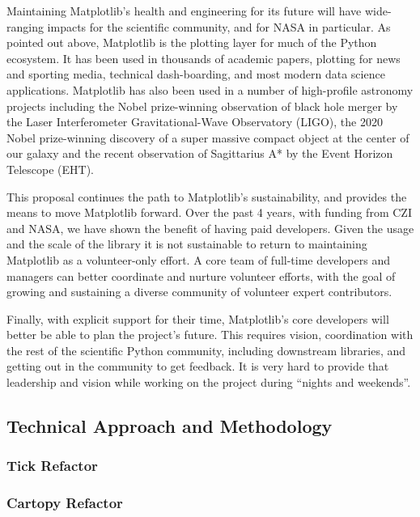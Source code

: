 \documentclass[12pt]{article}
\numberwithin{page}{section}
\begin{document}
Maintaining Matplotlib's health and engineering for its future will
have wide-ranging impacts for the scientific community, and for NASA in
particular.  As pointed out above, Matplotlib is the plotting layer
for much of the Python ecosystem.  It has been used in thousands of
academic papers, plotting for news and sporting media, technical
dash-boarding, and most modern data science applications.
Matplotlib has also been used in a number
of high-profile astronomy projects including the Nobel prize-winning
observation of black hole merger by the Laser Interferometer
Gravitational-Wave Observatory (LIGO), the 2020 Nobel prize-winning
discovery of a super massive compact object at the center of our
galaxy and the recent observation of Sagittarius A* by the Event
Horizon Telescope (EHT).

This proposal continues the path to Matplotlib's sustainability, and provides the means to
move Matplotlib forward.  Over the past 4 years, with funding from CZI and NASA, we have
shown the benefit of having paid developers.  Given the usage and the scale of
the library it is not sustainable to return to maintaining Matplotlib as a
volunteer-only effort.  A core team of full-time developers and managers can
better coordinate and nurture volunteer efforts, with the goal of growing and
sustaining a diverse community of volunteer expert contributors.

Finally, with explicit support for their time, Matplotlib's core developers
will better be able to plan the project's future.  This requires vision,
coordination with the rest of the scientific Python community, including
downstream libraries, and getting out in the community to get feedback.  It is
very hard to provide that leadership and vision while working on the project during
``nights and weekends''.

\subsection{Technical Approach and Methodology}
\subsubsection{Tick Refactor}
\subsubsection{Cartopy Refactor}
\end{document}
